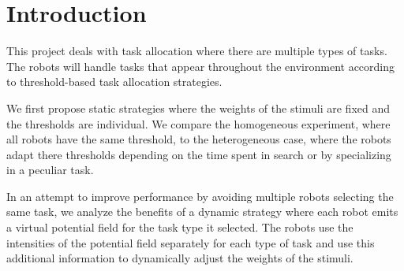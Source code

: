 \chapter*{Introduction}
This project deals with task allocation where there are multiple types of tasks. The robots will handle tasks that appear throughout the environment according to threshold-based task allocation strategies.

We first propose static strategies where the weights of the stimuli are fixed and the thresholds are individual. We compare the homogeneous experiment, where all robots have the same threshold, to the heterogeneous case, where the robots adapt there thresholds depending on the time spent in search or by specializing in a peculiar task.

In an attempt to improve performance by avoiding multiple robots selecting the same task, we analyze the benefits of a dynamic strategy where each robot emits a virtual potential field for the task type it selected. The robots use the intensities of the potential field separately for each type of task and use this additional information to dynamically adjust the weights of the stimuli.

